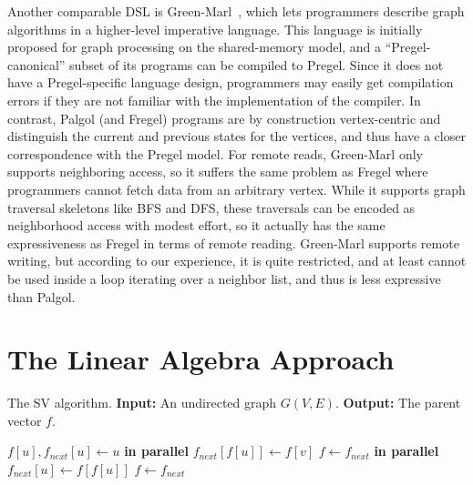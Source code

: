 \documentclass{sokendai_thesis} %
\begin{document}
Another comparable DSL is Green-Marl~\cite{green12}, which lets programmers describe graph algorithms in a higher-level imperative language.
This language is initially proposed for graph processing on the shared-memory model, and a ``Pregel-canonical'' subset of its programs can be compiled to Pregel.
Since it does not have a Pregel-specific language design, programmers may easily get compilation errors if they are not familiar with the implementation of the compiler.
In contrast, Palgol (and Fregel) programs are by construction vertex-centric and distinguish the current and previous states for the vertices, and thus have a closer correspondence with the Pregel model.
For remote reads, Green-Marl only supports neighboring access, so it suffers the same problem as Fregel where programmers cannot fetch data from an arbitrary vertex.
While it supports graph traversal skeletons like BFS and DFS, these traversals can be encoded as neighborhood access with modest effort, so it actually has the same expressiveness as Fregel in terms of remote reading.
Green-Marl supports remote writing, but according to our experience, it is quite restricted, and at least cannot be used inside a loop iterating over a neighbor list, and thus is less expressive than Palgol.



\chapter{The Linear Algebra Approach}
\label{chap:linear-algebra}


\begin{algorithm}[t]
\small
\caption{The SV algorithm. \textbf{Input:} An undirected graph $G(V,E)$. \textbf{Output:} The parent vector $f$.}
\label{algo:algo-one}
\begin{algorithmic}[1]
  \State $f[u], f_{\mathit{next}}[u] \leftarrow u$
\EndFor
\Repeat
  \State{}
   \textbf{in parallel}
      \State $f_{\mathit{next}}[f[u]] \leftarrow f[v]$
    \EndIf
  \EndFor
  \State $f\leftarrow f_{\mathit{next}}$
  \State{}
   \textbf{in parallel}
      \State $f_{\mathit{next}}[u] \leftarrow f[f[u]]$
    \EndIf
  \EndFor
  \State $f\leftarrow f_{\mathit{next}}$
\EndProcedure
\end{algorithmic}
\end{algorithm}
\end{document}
